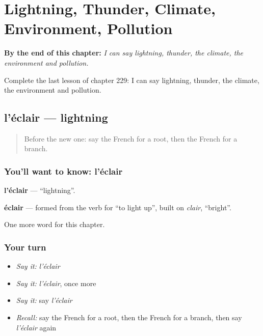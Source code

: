 
\chapter{Lightning, Thunder, Climate, Environment, Pollution}
\label{ch:fr-lightning-thunder-climate-environment-pollution}

\begin{chapteropening}
\textbf{By the end of this chapter:} \emph{I can say lightning, thunder, the climate, the environment and pollution.}

Complete the last lesson of chapter 229: I can say lightning, thunder, the climate, the environment and pollution.
\end{chapteropening}

\section[l'éclair]{l'éclair — lightning}

\label{lesson:FR-C229-eclair}



\begin{quote}
Before the new one: say the French for a root, then the French for a branch.
\end{quote}

\subsection*{You'll want to know: l'éclair}
\textbf{l'éclair} — \textquotedblleft{}lightning\textquotedblright{}.

\begin{cousinweb}
\textbf{éclair} — formed from the verb for \textquotedblleft{}to light up\textquotedblright{}, built on \emph{clair}, \textquotedblleft{}bright\textquotedblright{}.
\end{cousinweb}

\begin{grammarlens}[title={What you've built}]
One more word for this chapter.
\end{grammarlens}

\subsection*{Your turn}
\begin{itemize}
\raggedright
  \item \emph{Say it:} \emph{l'éclair}
  \item \emph{Say it:} \emph{l'éclair}, once more
  \item \emph{Say it:} say \emph{l'éclair}
  \item \emph{Recall:} say the French for a root, then the French for a branch, then say \emph{l'éclair} again
\end{itemize}

